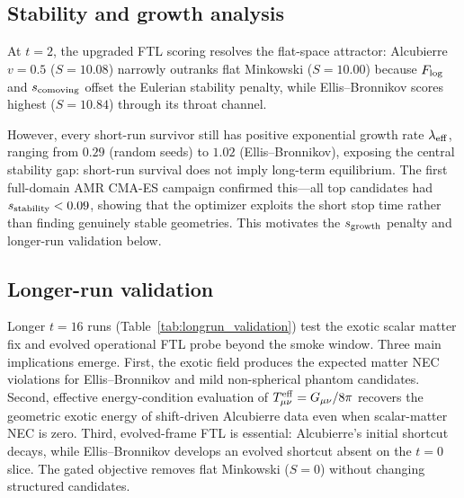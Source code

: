 \documentclass[twocolumn,floatfix,aps,prd,nofootinbib]{revtex4-2}
\begin{document}
\subsection{Stability and growth analysis}

At $t=2$, the upgraded FTL scoring resolves the flat-space attractor: Alcubierre $v=0.5$ ($S=10.08$) narrowly outranks flat Minkowski ($S=10.00$) because $F_{\rm log}$ and $s_{\rm comoving}$ offset the Eulerian stability penalty, while Ellis--Bronnikov scores highest ($S=10.84$) through its throat channel.

However, every short-run survivor still has positive exponential growth rate $\lambda_{\rm eff}$, ranging from $0.29$ (random seeds) to $1.02$ (Ellis--Bronnikov), exposing the central stability gap: short-run survival does not imply long-term equilibrium.  The first full-domain AMR CMA-ES campaign confirmed this---all top candidates had $s_{\rm stability}<0.09$, showing that the optimizer exploits the short stop time rather than finding genuinely stable geometries.  This motivates the $s_{\rm growth}$ penalty and longer-run validation below.

\subsection{Longer-run validation}

Longer $t=16$ runs (Table~\ref{tab:longrun_validation}) test the exotic scalar matter fix and evolved operational FTL probe beyond the smoke window.  Three main implications emerge.  First, the exotic field produces the expected matter NEC violations for Ellis--Bronnikov and mild non-spherical phantom candidates.  Second, effective energy-condition evaluation of $T^{\rm eff}_{\mu\nu}=G_{\mu\nu}/8\pi$ recovers the geometric exotic energy of shift-driven Alcubierre data even when scalar-matter NEC is zero.  Third, evolved-frame FTL is essential: Alcubierre's initial shortcut decays, while Ellis--Bronnikov develops an evolved shortcut absent on the $t=0$ slice.  The gated objective removes flat Minkowski ($S=0$) without changing structured candidates.
\end{document}
